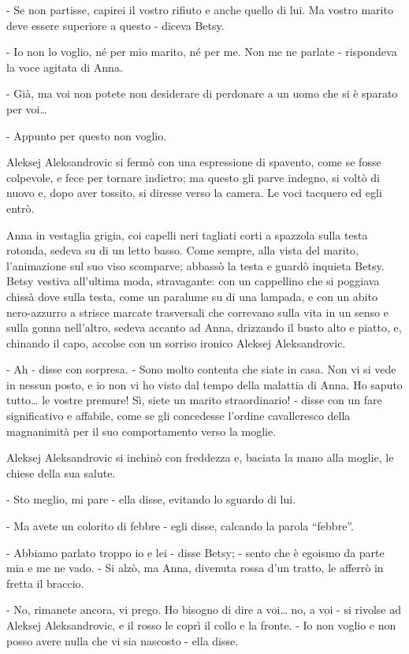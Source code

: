 - Se non partisse, capirei il vostro rifiuto e anche quello di lui. Ma vostro marito deve essere superiore a questo - diceva Betsy. 

- Io non lo voglio, né per mio marito, né per me. Non me ne parlate - rispondeva la voce agitata di Anna. 

- Già, ma voi non potete non desiderare di perdonare a un uomo che si è sparato per voi\ldots{} 

- Appunto per questo non voglio. 

Aleksej Aleksandrovic si fermò con una espressione di spavento, come se fosse colpevole, e fece per tornare indietro; ma questo gli parve indegno, si voltò di nuovo e, dopo aver tossito, si diresse verso la camera. Le voci tacquero ed egli entrò. 

Anna in vestaglia grigia, coi capelli neri tagliati corti a spazzola sulla testa rotonda, sedeva su di un letto basso. Come sempre, alla vista del marito, l'animazione sul suo viso scomparve; abbassò la testa e guardò inquieta Betsy. Betsy vestiva all'ultima moda, stravagante: con un cappellino che si poggiava chissà dove sulla testa, come un paralume su di una lampada, e con un abito nero-azzurro a strisce marcate trasversali che correvano sulla vita in un senso e sulla gonna nell'altro, sedeva accanto ad Anna, drizzando il busto alto e piatto, e, chinando il capo, accolse con un sorriso ironico Aleksej Aleksandrovic. 

- Ah - disse con sorpresa. - Sono molto contenta che siate in casa. Non vi si vede in nessun posto, e io non vi ho visto dal tempo della malattia di Anna. Ho saputo tutto\ldots{} le vostre premure! Sì, siete un marito straordinario! - disse con un fare significativo e affabile, come se gli concedesse l'ordine cavalleresco della magnanimità per il suo comportamento verso la moglie. 

Aleksej Aleksandrovic si inchinò con freddezza e, baciata la mano alla moglie, le chiese della sua salute. 

- Sto meglio, mi pare - ella disse, evitando lo sguardo di lui. 

- Ma avete un colorito di febbre - egli disse, calcando la parola ``febbre''. 

- Abbiamo parlato troppo io e lei - disse Betsy; - sento che è egoismo da parte mia e me ne vado. - Si alzò, ma Anna, divenuta rossa d'un tratto, le afferrò in fretta il braccio. 

- No, rimanete ancora, vi prego. Ho bisogno di dire a voi\ldots{} no, a voi - si rivolse ad Aleksej Aleksandrovic, e il rosso le coprì il collo e la fronte. - Io non voglio e non posso avere nulla che vi sia nascosto - ella disse. 

